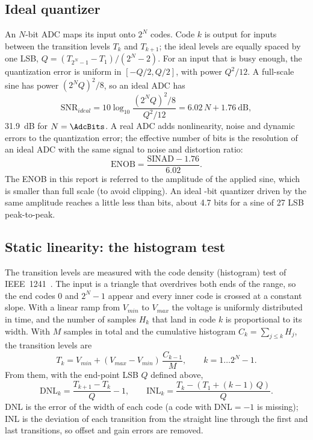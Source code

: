 
\subsection{Ideal quantizer}
An $N$-bit ADC maps its input onto $2^N$ codes. Code $k$ is output for inputs between the
transition levels $T_k$ and $T_{k+1}$; the ideal levels are equally spaced by one LSB,
$Q = (T_{2^N-1} - T_1)/(2^N - 2)$. For an input that is busy enough, the quantization error is
uniform in $[-Q/2, Q/2]$, with power $Q^2/12$. A full-scale sine has power
$(2^N Q)^2/8$, so an ideal ADC has
\begin{equation}
\text{SNR}_{ideal} = 10\log_{10}\frac{(2^N Q)^2/8}{Q^2/12} = 6.02\,N + 1.76\ \text{dB},
\end{equation}
\SI{31.9}{dB} for $N = \AdcBits$. A real ADC adds nonlinearity, noise and dynamic errors to the
quantization error; the effective number of bits is the resolution of an ideal ADC with the
same signal to noise and distortion ratio:
\begin{equation}
\text{ENOB} = \frac{\text{SINAD} - 1.76}{6.02}.
\end{equation}
The ENOB in this report is referred to the amplitude of the applied sine, which is smaller than
full scale (to avoid clipping). An ideal \AdcBits-bit quantizer driven by the same amplitude
reaches a little less than \AdcBits{} bits, about 4.7 bits for a sine of 27 LSB peak-to-peak.

\subsection{Static linearity: the histogram test}
The transition levels are measured with the code density (histogram) test of IEEE~1241~\cite{ieee1241}. The input
is a triangle that overdrives both ends of the range, so the end codes $0$ and $2^N-1$ appear and
every inner code is crossed at a constant slope. With a linear ramp from $V_{min}$ to $V_{max}$ the
voltage is uniformly distributed in time, and the number of samples $H_k$ that land in code $k$ is
proportional to its width. With $M$ samples in total and the cumulative histogram
$C_k = \sum_{j \le k} H_j$, the transition levels are
\begin{equation}
T_k = V_{min} + (V_{max} - V_{min})\,\frac{C_{k-1}}{M}, \qquad k = 1 \ldots 2^N - 1.
\end{equation}
From them, with the end-point LSB $Q$ defined above,
\begin{equation}
\text{DNL}_k = \frac{T_{k+1} - T_k}{Q} - 1, \qquad
\text{INL}_k = \frac{T_k - \left(T_1 + (k-1)\,Q\right)}{Q}.
\end{equation}
DNL is the error of the width of each code (a code with $\text{DNL} = -1$ is missing); INL is the
deviation of each transition from the straight line through the first and last transitions, so
offset and gain errors are removed.

